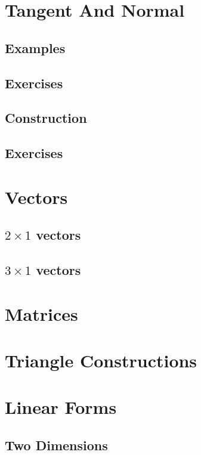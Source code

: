 \documentclass[11pt]{book}
\begin{document}
\chapter{Tangent And Normal}
\section{Examples}

\section{Exercises}

\section{Construction}

\section{Exercises}



% 
\backmatter
\appendix
\chapter{ Vectors}
\section{$2\times 1$ vectors}

%
\section{$3\times 1$ vectors}

\chapter{Matrices}



\chapter{Triangle Constructions}



\chapter{Linear Forms}
\section{Two Dimensions}

\end{document}
